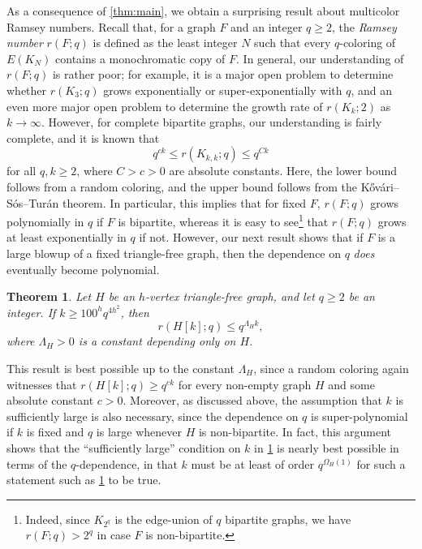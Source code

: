\documentclass{aic}
\theoremstyle{plain}
\newtheorem{theorem}{Theorem}[section]
\theoremstyle{remark}
\begin{document}
As a consequence of \cref{thm:main}, we obtain a surprising result about multicolor Ramsey numbers. Recall that, for a graph $F$ and an integer $q \geq 2$, the \emph{Ramsey number} $r(F;q)$ is defined as the least integer $N$ such that every $q$-coloring of $E(K_N)$ contains a monochromatic copy of $F$. In general, our understanding of $r(F;q)$ is rather poor; for example, it is a major open problem \cite{MR1815606,MR4357431,MR0177846} to determine whether $r(K_3;q)$ grows exponentially or super-exponentially with $q$, and an even more major open problem \cite{MR366726,MR2552114,MR4548417,2303.09521} to determine the growth rate of $r(K_k;2)$ as $k \to \infty$. However, for complete bipartite graphs, our understanding is fairly complete, and it is known \cite{MR0360329} that
\begin{equation}\label{eq:multicolor K_kk}
    q^{ck} \leq r(K_{k,k};q) \leq q^{Ck}
\end{equation}
for all $q,k \geq 2$, where $C>c>0$ are absolute constants. Here, the lower bound follows from a random coloring, and the upper bound follows from the K\H ov\'ari--S\'os--Tur\'an theorem. In particular, this implies that for fixed $F$,
$r(F;q)$ grows polynomially in $q$ if $F$ is bipartite, whereas it is easy to see\footnote{Indeed, since $K_{2^q}$ is the edge-union of $q$ bipartite graphs, we have $r(F;q)>2^q$ in case $F$ is non-bipartite.}  that $r(F;q)$ grows at least exponentially in $q$ if not. However, our next result shows that if $F$ is a large blowup of a fixed triangle-free graph, then the dependence on $q$ \emph{does} eventually become polynomial.
\begin{theorem}\label{thm:multicolor ramsey}
    Let $H$ be an $h$-vertex triangle-free graph, and let $q \geq 2$ be an integer. If $k \geq 100^h q^{4h^2}$, then
    \[
        r(H[k];q) \leq q^{\Lambda_H k},
    \]
    where $\Lambda_H>0$ is a constant depending only on $H$.
\end{theorem}
This result is best possible up to the constant $\Lambda_H$, since a random coloring again witnesses that $r(H[k];q)\geq q^{ck}$ for every non-empty graph $H$ and some absolute constant $c>0$. Moreover, as discussed above, the assumption that $k$ is sufficiently large is also necessary, since the dependence on $q$ is super-polynomial if $k$ is fixed and $q$ is large whenever $H$ is non-bipartite. In fact, this argument shows that the ``sufficiently large'' condition on $k$ in \cref{thm:multicolor ramsey} is nearly best possible in terms of the $q$-dependence, in that $k$ must be at least of order $q^{\Omega_H(1)}$ for such a statement such as \cref{thm:multicolor ramsey} to be true.
\end{document}
